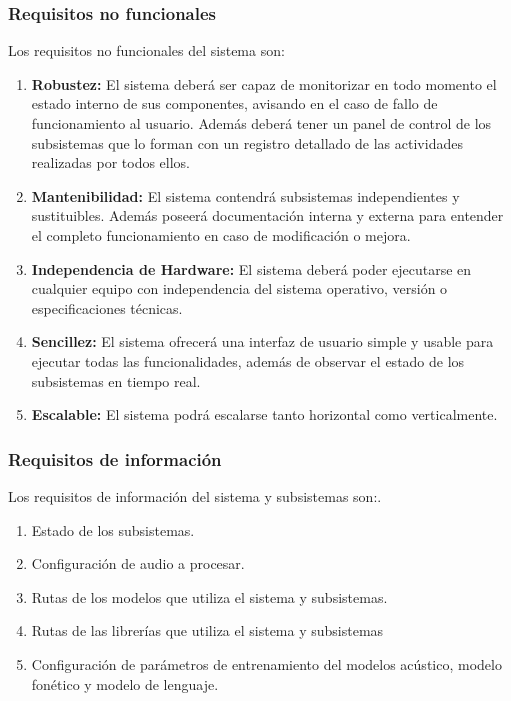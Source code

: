 \documentclass[../main.tex]{subfiles}
\begin{document}
\subsubsection{Requisitos no funcionales}\label{subsubsec:req_nofuncionales}
Los requisitos no funcionales del sistema son:
\begin{enumerate}
    \item \textbf{Robustez:} El sistema deberá ser capaz de monitorizar en todo momento el estado interno de sus componentes, avisando en el caso de fallo de funcionamiento al usuario. 
    Además deberá tener un panel de control de los subsistemas que lo forman con un registro detallado de las actividades realizadas por todos ellos.
    \item \textbf{Mantenibilidad:} El sistema contendrá subsistemas independientes y sustituibles. 
    Además poseerá documentación interna y externa para entender el completo funcionamiento en caso de modificación o mejora.
    \item \textbf{Independencia de Hardware:} El sistema deberá poder ejecutarse en cualquier equipo con independencia del sistema operativo, versión o especificaciones técnicas.
    \item \textbf{Sencillez:} El sistema ofrecerá una interfaz de usuario simple y usable para ejecutar todas las funcionalidades, además de observar el estado de los subsistemas en tiempo real.
    \item \textbf{Escalable:} El sistema podrá escalarse tanto horizontal como verticalmente.
\end{enumerate}

\subsubsection{Requisitos de información}\label{subsubsec:req_informacion}
Los requisitos de información del sistema y subsistemas son:.
\begin{enumerate}
    \item Estado de los subsistemas.
    \item Configuración de audio a procesar.
    \item Rutas de los modelos que utiliza el sistema y subsistemas.
    \item Rutas de las librerías que utiliza el sistema y subsistemas
    \item Configuración de parámetros de entrenamiento del modelos acústico, modelo fonético y modelo de lenguaje.
\end{enumerate}
\end{document}

